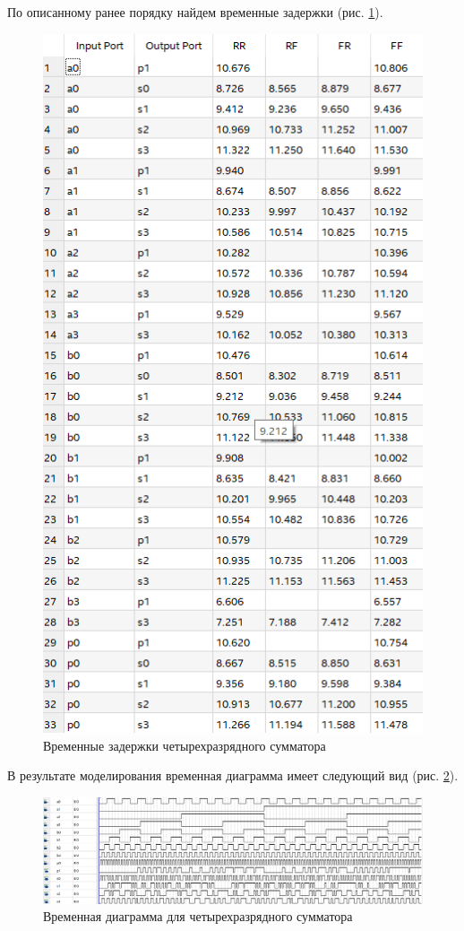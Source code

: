 \documentclass[a4paper,14pt]{article}
\begin{document}
По описанному ранее порядку найдем временные задержки (рис. \ref{fig:044sumtime}).

\begin{figure}[H]
	\centering
	\includegraphics[width=0.7\linewidth]{image/lab4/04_4sum_time}
	\caption{Временные задержки четырехразрядного сумматора}
	\label{fig:044sumtime}
\end{figure}


В результате моделирования временная диаграмма имеет следующий вид (рис. \ref{fig:044sumwvf}).

\begin{figure}[H]
	\centering
	\includegraphics[width=0.9\linewidth]{image/lab4/04_4sum_wvf}
	\caption{Временная диаграмма для четырехразрядного сумматора}
	\label{fig:044sumwvf}
\end{figure}
\end{document}
